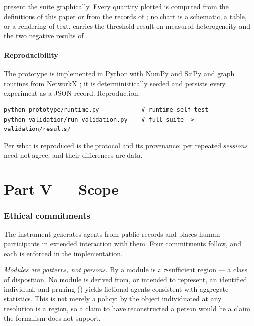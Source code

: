 \documentclass[11pt,a4paper]{article}
\theoremstyle{clstyle}
\theoremstyle{definition}
\theoremstyle{remark}
\begin{document}
 present the suite graphically. Every
quantity plotted is computed from the definitions of this paper or from
the records of ; no chart is a schematic, a table, or
a rendering of text.  carries the threshold result on
measured heterogeneity and  the two negative results of
.



\subsection{Reproducibility}

The prototype is implemented in Python with NumPy and SciPy
\citep{harris2020array,virtanen2020scipy} and graph routines from NetworkX
\citep{hagberg2008exploring}; it is deterministically seeded and persists
every experiment as a JSON record. Reproduction:
\begin{verbatim}
python prototype/runtime.py            # runtime self-test
python validation/run_validation.py    # full suite -> validation/results/
\end{verbatim}
Per  what is reproduced is the protocol and its provenance;
per  repeated \emph{sessions} need not agree, and
their differences are data.

\part*{Part V --- Scope}

\section{Ethical commitments}
\label{sec:ethics}

The instrument generates agents from public records and places human
participants in extended interaction with them. Four commitments follow, and
each is enforced in the implementation.

\emph{Modules are patterns, not persons.} By  a module is a
$\tau$-sufficient region --- a class of disposition. No module is derived
from, or intended to represent, an identified individual, and pruning
() yields fictional agents consistent with aggregate
statistics. This is not merely a policy: by  the object
individuated at any resolution is a region, so a claim to have reconstructed
a person would be a claim the formalism does not support.
\end{document}
